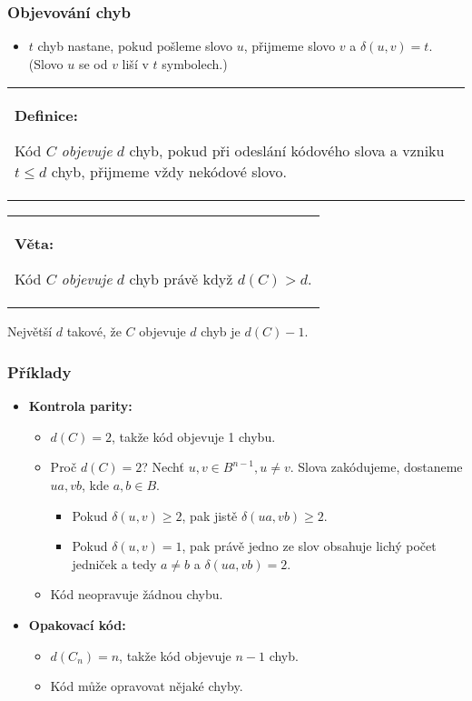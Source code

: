 \documentclass{beamer}
\newenvironment{definice}
{
    \begin{center}
    \begin{tabular}{p{9cm}}
    \textbf{Definice:}
}
{
    \end{tabular}
    \end{center}
}
\newenvironment{veta}
{
    \begin{center}
    \begin{tabular}{p{9cm}}
    \textbf{Věta:}
}
{
    \end{tabular}
    \end{center}
}
\newenvironment{itemizex}%
  {\large \begin{itemize}%
    \setlength{\itemsep}{8pt}%
    \setlength{\parskip}{8pt}}%
  {\end{itemize}}
\begin{document}
\begin{frame}[t,fragile]\frametitle{Objevování chyb} 
    \begin{itemizex}
        \item $t$ chyb nastane, pokud pošleme slovo $u$, přijmeme slovo $v$ a $\delta(u,v)=t$. (Slovo $u$ se od $v$ liší v $t$ symbolech.)
    \end{itemizex}

\begin{definice}
Kód $C$ \textit{objevuje} $d$ chyb, pokud při odeslání kódového slova a vzniku $t\le d$ chyb, přijmeme vždy nekódové slovo.
\end{definice}

\begin{veta}
Kód $C$ \textit{objevuje} $d$ chyb právě když $d(C)>d$.
\end{veta}

Největší $d$ takové, že $C$ objevuje $d$ chyb je $d(C)-1$.
\end{frame}


\begin{frame}[t,fragile]\frametitle{Příklady} 
    \begin{itemizex}
        \item \textbf{Kontrola parity:}
        \begin{itemize}
            \item $d(C)=2$, takže kód objevuje 1 chybu.
            \item Proč $d(C)=2$? Nechť $u,v\in B^{n-1}, u\ne v$. Slova zakódujeme, dostaneme $ua, vb$, kde $a, b\in B$. 
            \begin{itemize}
                \item Pokud $\delta(u,v)\ge2$, pak jistě $\delta(ua, vb)\ge2$.
                \item Pokud $\delta(u,v)=1$, pak právě jedno ze slov obsahuje lichý počet jedniček a tedy $a\ne b$ a $\delta(ua, vb)=2$. 
            \end{itemize}
            \item Kód neopravuje žádnou chybu.
        \end{itemize}
        \item \textbf{Opakovací kód:}
            \begin{itemize}
                \item $d(C_n)=n$, takže kód objevuje $n-1$ chyb.
                \item Kód může opravovat nějaké chyby.
            \end{itemize}
    \end{itemizex}
\end{frame}
\end{document}
